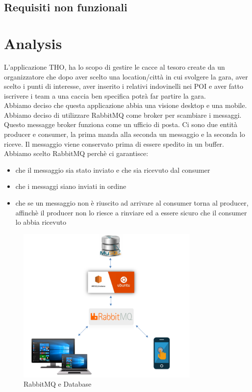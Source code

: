 \documentclass[12pt, english]{report}
\begin{document}
\section{Requisiti non funzionali}






\chapter{Analysis}
L'applicazione THO, ha lo scopo di gestire le cacce al tesoro create da un organizzatore che dopo aver scelto una location/città in cui svolgere la gara, aver scelto i punti di interesse, aver inserito i relativi indovinelli nei POI e aver fatto iscrivere i team a una caccia ben specifica potrà far partire la gara.
\\Abbiamo deciso che questa applicazione abbia una visione desktop e una mobile.
\\Abbiamo deciso di utilizzare RabbitMQ come broker per scambiare i messaggi. Questo messagge broker funziona come un ufficio di posta. Ci sono due entità producer e consumer, la prima manda alla seconda un messaggio e la seconda lo riceve. Il messaggio viene conservato prima di essere spedito in un buffer. Abbiamo scelto RabbitMQ perchè ci garantisce:
\begin{itemize}
	\item che il messaggio sia stato inviato e che sia ricevuto dal consumer
	\item che i messaggi siano inviati in ordine
	\item che se un messaggio non è riuscito ad arrivare al consumer torna al producer, affinchè il producer non lo riesce a rinviare ed a essere sicuro che il consumer lo abbia ricevuto
\end{itemize}

\begin{figure}[H]
	\centering
	\includegraphics[width=0.8\textwidth]{img/rabbit.png}
	\caption{RabbitMQ e Database}
\end{figure}
\end{document}
